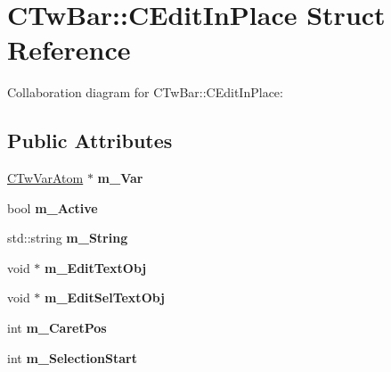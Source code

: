 \hypertarget{struct_c_tw_bar_1_1_c_edit_in_place}{\section{C\+Tw\+Bar\+:\+:C\+Edit\+In\+Place Struct Reference}
\label{struct_c_tw_bar_1_1_c_edit_in_place}
}


Collaboration diagram for C\+Tw\+Bar\+:\+:C\+Edit\+In\+Place\+:
\subsection*{Public Attributes}
\begin{DoxyCompactItemize}
\item 
\hypertarget{struct_c_tw_bar_1_1_c_edit_in_place_aba480d2fd72ff23f2686843b6b60819e}{\hyperlink{struct_c_tw_var_atom}{C\+Tw\+Var\+Atom} $\ast$ {\bfseries m\+\_\+\+Var}}\label{struct_c_tw_bar_1_1_c_edit_in_place_aba480d2fd72ff23f2686843b6b60819e}

\item 
\hypertarget{struct_c_tw_bar_1_1_c_edit_in_place_a0a8be768f20d65f03fa809059f19213a}{bool {\bfseries m\+\_\+\+Active}}\label{struct_c_tw_bar_1_1_c_edit_in_place_a0a8be768f20d65f03fa809059f19213a}

\item 
\hypertarget{struct_c_tw_bar_1_1_c_edit_in_place_a05adee030f21ae327ce4ae81d6d25a83}{std\+::string {\bfseries m\+\_\+\+String}}\label{struct_c_tw_bar_1_1_c_edit_in_place_a05adee030f21ae327ce4ae81d6d25a83}

\item 
\hypertarget{struct_c_tw_bar_1_1_c_edit_in_place_a9a6db7bf198b3605353a1fac8cec1627}{void $\ast$ {\bfseries m\+\_\+\+Edit\+Text\+Obj}}\label{struct_c_tw_bar_1_1_c_edit_in_place_a9a6db7bf198b3605353a1fac8cec1627}

\item 
\hypertarget{struct_c_tw_bar_1_1_c_edit_in_place_a6f4044e1b200df3423e0bdf22fa59370}{void $\ast$ {\bfseries m\+\_\+\+Edit\+Sel\+Text\+Obj}}\label{struct_c_tw_bar_1_1_c_edit_in_place_a6f4044e1b200df3423e0bdf22fa59370}

\item 
\hypertarget{struct_c_tw_bar_1_1_c_edit_in_place_acc656127b81c27f5f231d5c9e99f41bf}{int {\bfseries m\+\_\+\+Caret\+Pos}}\label{struct_c_tw_bar_1_1_c_edit_in_place_acc656127b81c27f5f231d5c9e99f41bf}

\item 
\hypertarget{struct_c_tw_bar_1_1_c_edit_in_place_a88ba4e0bd87463b44aedf280ecd6fc0a}{int {\bfseries m\+\_\+\+Selection\+Start}}\label{struct_c_tw_bar_1_1_c_edit_in_place_a88ba4e0bd87463b44aedf280ecd6fc0a}


\end{DoxyCompactItemize}
